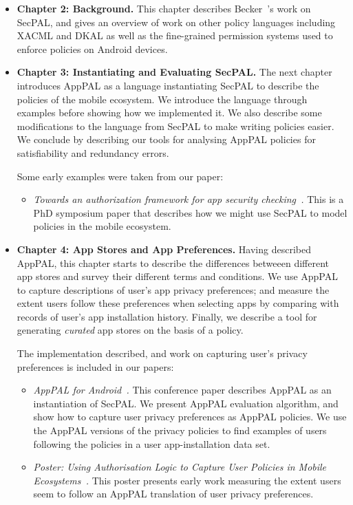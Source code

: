 \documentclass[thesis.tex]{subfiles}
\begin{document}
\begin{itemize}
\item \textbf{Chapter 2: Background.}  This chapter describes
  Becker~\etal's work on SecPAL, and gives an overview of work on other
  policy languages including XACML and DKAL as well as the fine-grained
  permission systems used to enforce policies on Android devices.

\item \textbf{Chapter 3: Instantiating and Evaluating SecPAL.}  The
  next chapter introduces AppPAL as a language instantiating SecPAL to
  describe the policies of the mobile ecosystem. We introduce the
  language through examples before showing how we implemented it. We
  also describe some modifications to the language from SecPAL to make
  writing policies easier. We conclude by describing our tools for
  analysing AppPAL policies for satisfiability and redundancy errors.
  
  Some early examples were taken from our paper:
  \begin{itemize}
  \item\emph{Towards an authorization framework for app security
      checking~\cite{hallett_towards_2014}.} This is a PhD symposium paper that describes how
    we might use SecPAL to model policies in the mobile ecosystem.
  \end{itemize}

\item \textbf{Chapter 4: App Stores and App Preferences.} 
  Having described AppPAL, this chapter starts to describe the differences betweeen different
  app stores and survey their different terms and conditions. We use AppPAL to
  capture descriptions of user's app privacy preferences; and measure the extent
  users follow these preferences when selecting apps by comparing with records of
  user's app installation history. Finally, we describe a tool for generating
  \emph{curated} app stores on the basis of a policy.
  
  The implementation described, and work on capturing user's privacy preferences is included in our papers:
  \begin{itemize}
  \item\emph{AppPAL for Android~\cite{hallett_apppal_2016}.} This
    conference paper describes AppPAL as an instantiation of SecPAL.  We
    present AppPAL evaluation algorithm, and show how to capture user
    privacy preferences as AppPAL policies. We use the AppPAL versions of
    the privacy policies to find examples of users following the policies
    in a user app-installation data set.
  \item\emph{Poster: Using Authorisation Logic to Capture User
      Policies in Mobile Ecosystems~\cite{hallett_poster:_2015}.}  This
    poster presents early work measuring the extent users seem to follow
    an AppPAL translation of user privacy preferences.
  \end{itemize}


\end{itemize}
\end{document}

